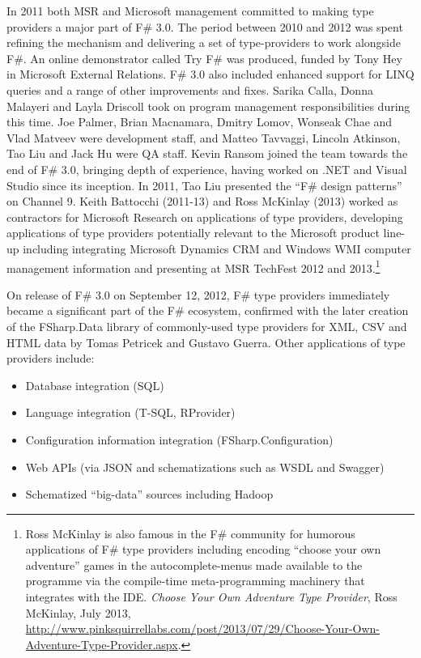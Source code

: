 \documentclass[acmsmall,review]{acmart}\settopmatter{printfolios=true,printccs=false,printacmref=false}
\begin{document}
In 2011 both MSR and Microsoft management committed to making type providers a major part of F\# 3.0. The period
between 2010 and 2012 was spent refining the mechanism and delivering a set of type-providers to work alongside F\#.
An online demonstrator called Try F\# was produced, funded by Tony Hey in Microsoft External Relations. F\# 3.0 also
included enhanced support for LINQ queries and a range of other improvements and fixes. Sarika Calla, Donna Malayeri
and Layla Driscoll took on program management responsibilities during this time.  Joe Palmer, Brian Macnamara, Dmitry
Lomov, Wonseak Chae and Vlad Matveev were development staff, and Matteo Tavvaggi, Lincoln Atkinson, Tao Liu and
Jack Hu were QA staff. Kevin Ransom joined the team towards the end of F\# 3.0, bringing depth of experience, having
worked on .NET and Visual Studio since its inception. In 2011, Tao Liu presented the “F\# design patterns” on Channel 9.
Keith Battocchi (2011-13) and Ross McKinlay (2013) worked as contractors for Microsoft Research on applications of type
providers, developing applications of type providers potentially relevant to the Microsoft product line-up including integrating
Microsoft Dynamics CRM and Windows WMI computer management information and presenting at MSR TechFest 2012 and
2013.\footnote{ Ross McKinlay is also famous in the F\# community for humorous applications of F\# type providers
including encoding “choose your own adventure” games in the autocomplete-menus made available to the programme
via the compile-time meta-programming machinery that integrates with the IDE. \textit{Choose Your Own Adventure
Type Provider}, Ross McKinlay, July 2013, \url{http://www.pinksquirrellabs.com/post/2013/07/29/Choose-Your-Own-Adventure-Type-Provider.aspx}.}

On release of F\# 3.0 on September 12, 2012,  F\# type providers immediately became a significant part of the F\# ecosystem, confirmed with the later creation of the FSharp.Data library of commonly-used type providers for XML, CSV and HTML data by Tomas Petricek and Gustavo Guerra.  Other applications of type providers include:

\begin{itemize}
\item Database integration (SQL)
\item Language integration (T-SQL, RProvider)
\item Configuration information integration (FSharp.Configuration)
\item Web APIs (via JSON and schematizations such as WSDL and Swagger)
\item Schematized “big-data” sources including Hadoop
\end{itemize}
\end{document}
